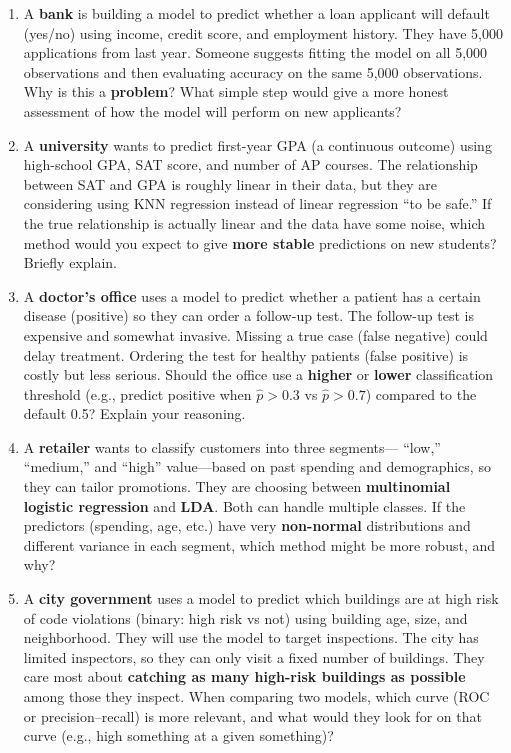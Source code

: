 \documentclass[11pt]{article}
\begin{document}
\begin{enumerate}[leftmargin=*, resume]
\item A \textbf{bank} is building a model to predict whether a loan applicant will default (yes/no) using income, credit score, and employment history. They have 5,000 applications from last year. Someone suggests fitting the model on all 5,000 observations and then evaluating accuracy on the same 5,000 observations. Why is this a \textbf{problem}? What simple step would give a more honest assessment of how the model will perform on new applicants?

\item A \textbf{university} wants to predict first-year GPA (a continuous outcome) using high-school GPA, SAT score, and number of AP courses. The relationship between SAT and GPA is roughly linear in their data, but they are considering using KNN regression instead of linear regression “to be safe.” If the true relationship is actually linear and the data have some noise, which method would you expect to give \textbf{more stable} predictions on new students? Briefly explain.

\item A \textbf{doctor’s office} uses a model to predict whether a patient has a certain disease (positive) so they can order a follow-up test. The follow-up test is expensive and somewhat invasive. Missing a true case (false negative) could delay treatment. Ordering the test for healthy patients (false positive) is costly but less serious. Should the office use a \textbf{higher} or \textbf{lower} classification threshold (e.g., predict positive when $\hat{p} > 0.3$ vs $\hat{p} > 0.7$) compared to the default 0.5? Explain your reasoning.

\item A \textbf{retailer} wants to classify customers into three segments— “low,” “medium,” and “high” value—based on past spending and demographics, so they can tailor promotions. They are choosing between \textbf{multinomial logistic regression} and \textbf{LDA}. Both can handle multiple classes. If the predictors (spending, age, etc.) have very \textbf{non-normal} distributions and different variance in each segment, which method might be more robust, and why?

\item A \textbf{city government} uses a model to predict which buildings are at high risk of code violations (binary: high risk vs not) using building age, size, and neighborhood. They will use the model to target inspections. The city has limited inspectors, so they can only visit a fixed number of buildings. They care most about \textbf{catching as many high-risk buildings as possible} among those they inspect. When comparing two models, which curve (ROC or precision–recall) is more relevant, and what would they look for on that curve (e.g., high something at a given something)?

\end{enumerate}
\end{document}
